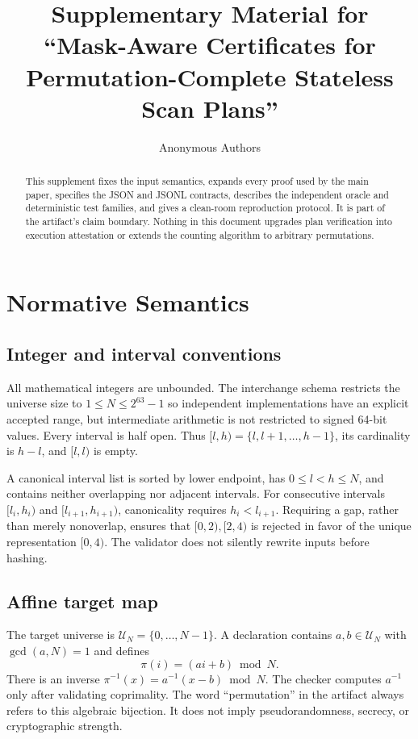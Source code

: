 \documentclass[11pt,onecolumn]{IEEEtran}
\title{Supplementary Material for\\``Mask-Aware Certificates for Permutation-Complete Stateless Scan Plans''}
\author{Anonymous Authors}
\date{}
\newcommand{\U}{\mathcal U}
\begin{document}
\maketitle
\begin{abstract}
This supplement fixes the input semantics, expands every proof used by the main paper, specifies the JSON and JSONL contracts, describes the independent oracle and deterministic test families, and gives a clean-room reproduction protocol.  It is part of the artifact's claim boundary.  Nothing in this document upgrades plan verification into execution attestation or extends the counting algorithm to arbitrary permutations.
\end{abstract}
\tableofcontents

\section{Normative Semantics}
\subsection{Integer and interval conventions}
All mathematical integers are unbounded.  The interchange schema restricts the universe size to $1\leq N\leq2^{63}-1$ so independent implementations have an explicit accepted range, but intermediate arithmetic is not restricted to signed 64-bit values.  Every interval is half open.  Thus $[l,h)=\{l,l+1,\ldots,h-1\}$, its cardinality is $h-l$, and $[l,l)$ is empty.

A canonical interval list is sorted by lower endpoint, has $0\leq l<h\leq N$, and contains neither overlapping nor adjacent intervals.  For consecutive intervals $[l_i,h_i)$ and $[l_{i+1},h_{i+1})$, canonicality requires $h_i<l_{i+1}$.  Requiring a gap, rather than merely nonoverlap, ensures that $[0,2),[2,4)$ is rejected in favor of the unique representation $[0,4)$.  The validator does not silently rewrite inputs before hashing.

\subsection{Affine target map}
The target universe is $\U_N=\{0,\ldots,N-1\}$.  A declaration contains $a,b\in\U_N$ with $\gcd(a,N)=1$ and defines
\begin{equation}
  \pi(i)=(ai+b)\bmod N.
\end{equation}
There is an inverse $\pi^{-1}(x)=a^{-1}(x-b)\bmod N$.  The checker computes $a^{-1}$ only after validating coprimality.  The word ``permutation'' in the artifact always refers to this algebraic bijection.  It does not imply pseudorandomness, secrecy, or cryptographic strength.
\end{document}
